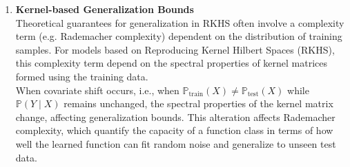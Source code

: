 \begin{enumerate}
    Kernel methods provide a powerful framework for nonparametric learning by embedding probability distributions into a reproducing kernel Hilbert space (RKHS) \citep{gretton2009covariate}. The central idea is to map a probability distribution $\mathbb{P}$ to a feature space through its expectation:

    \begin{equation}
        \mu_{\mathbb{P}} = \mathbb{E}_{X \sim \mathbb{P}}[\phi(X)]
        \label{eqn:2.3}
    \end{equation}
    
    where $\phi(X)$ is a feature map induced by a positive definite kernel. Such feature space representations based on kernel mean embeddings allows us to compare distributions in RKHS using the Maximum Mean Discrepancy (MMD):

    \begin{equation}
        \text{MMD}(P,Q) = \lVert \mu_P - \mu_Q \rVert_{\mathcal{H}}
        \label{eqn:2.4}
    \end{equation}
    
    Under covariate shift, the training and test distributions differ in their marginal distribution of inputs, i.e., $\mathbb{P}_{\text{train}}(X) \neq \mathbb{P}_{\text{test}}(X)$, while keeping the conditional distribution of labels given inputs the same: $\mathbb{P}(Y \mid X)$ remains unchanged in both training and test set. This shift results in a discrepancy between the mean embeddings:

    \begin{equation}
        \mu_{\text{train}} = \mathbb{E}_{X \sim \mathbb{P}_{\text{train}}}[\phi(X)]] \neq \mu_{\text{test}} = \mathbb{E}_{X \sim \mathbb{P}_{\text{test}}}[\phi(X)]]
        \label{eqn:2.5}
    \end{equation}

    \item \textbf{Kernel-based Generalization Bounds}\\

    Theoretical guarantees for generalization in RKHS often involve a complexity term (e.g. Rademacher complexity) dependent on the distribution of training samples. For models based on Reproducing Kernel Hilbert Spaces (RKHS), this complexity term depend on the spectral properties of kernel matrices formed using the training data. \citep{mohri2018foundations}\\ 
    
    When covariate shift occurs, i.e., when $\mathbb{P}_{\text{train}}(X) \neq \mathbb{P}_{\text{test}}(X)$ while $\mathbb{P}(Y \mid X)$ remains unchanged, the spectral properties of the kernel matrix change, affecting generalization bounds. This alteration affects Rademacher complexity, which quantify the capacity of a function class in terms of how well the learned function can fit random noise and generalize to unseen test data.


\end{enumerate}
